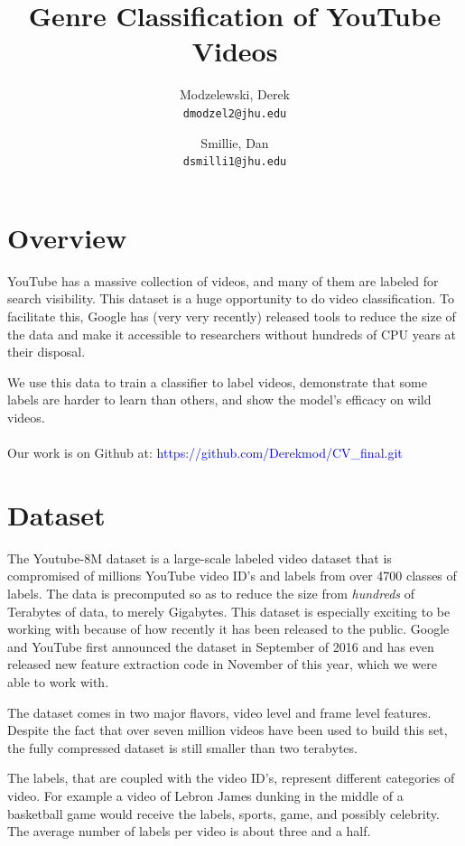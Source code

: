 \documentclass{article}
\title{Genre Classification of YouTube Videos}
\author{
  Modzelewski, Derek\\
  \texttt{dmodzel2@jhu.edu}
  \and
  Smillie, Dan\\
  \texttt{dsmilli1@jhu.edu}
}
\newcommand{\ind}[0]{\indent}
\begin{document}
\maketitle

\tableofcontents

\section{Overview} %

\ind\ind YouTube has a massive collection of videos, and many of them are labeled for search visibility. This dataset is a huge opportunity to do video classification. To facilitate this, Google has (very very recently) released tools to reduce the size of the data and make it accessible to researchers without hundreds of CPU years at their disposal.

We use this data to train a classifier to label videos, demonstrate that some labels are harder to learn than others, and show the model’s efficacy on wild videos. \\
\\
Our work is on Github at: \textcolor{blue}{https://github.com/Derekmod/CV\_final.git}


\section{Dataset} %

\ind\ind The Youtube-8M dataset is a large-scale labeled video dataset that is compromised of millions YouTube video ID’s and labels from over 4700 classes of labels. The data is precomputed so as to reduce the size from {\it hundreds} of Terabytes of data, to merely Gigabytes. This dataset is especially exciting to be working with because of how recently it has been released to the public. Google and YouTube first announced the dataset in September of 2016 and has even released new feature extraction code in November of this year, which we were able to work with. 

The dataset comes in two major flavors, video level and frame level features. Despite the fact that over seven million videos have been used to build this set, the fully compressed dataset is still smaller than two terabytes. 

The labels, that are coupled with the video ID’s, represent different categories of video. For example a video of Lebron James dunking in the middle of a basketball game would receive the labels, sports, game, and possibly celebrity. The average number of labels per video is about three and a half. 
\end{document}
